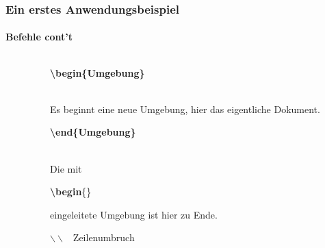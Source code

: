 \begin{frame}
\frametitle{Ein erstes Anwendungsbeispiel}
\framesubtitle{Befehle cont't}
\begin{columns}
\begin{column}{0.6\textwidth}
\begin{ttfamily}\scriptsize

 \normalsize
\end{ttfamily}
\end{column}
\begin{column}{0.4\textwidth}
\begin{ttfamily}\textbf{\color{unibablueI}\textbackslash begin\color{black}\{Umgebung\}}\end{ttfamily}\\
Es beginnt eine neue Umgebung, hier das eigentliche Dokument.\\[5mm]

\begin{ttfamily}\textbf{\color{unibablueI}\textbackslash end\color{black}\{Umgebung\}}\end{ttfamily}\\
Die mit \begin{ttfamily}\textbf{\color{unibablueI}\textbackslash begin}\color{black}\{\}\end{ttfamily}
eingeleitete Umgebung ist hier zu Ende.\\[5mm]

\begin{ttfamily}\textbf{\color{nounibaredII}$\backslash\backslash$}\color{black}
~Zeilenumbruch\end{ttfamily}\\
\end{column}
\end{columns}
\end{frame}



